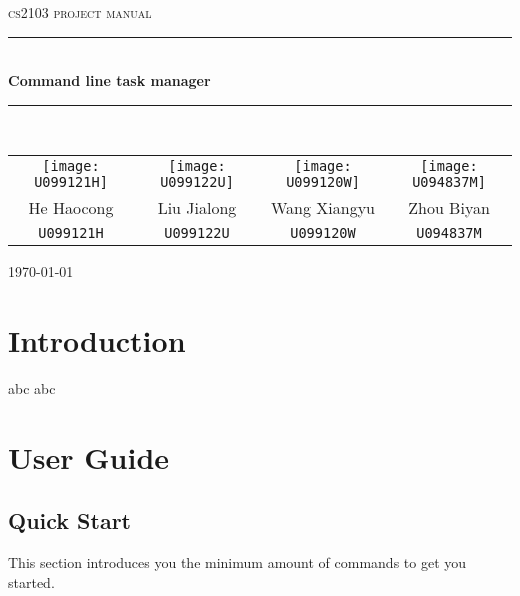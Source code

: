 \documentclass[12pt, a4paper]{article}
\begin{document}
\begin{titlepage}
  \centering

  \textsc{\LARGE cs2103 project manual}
  \\[1.5cm]
  \hrule
  \\[0.5cm]
  \Large \bfseries Command line task manager
  \\[0.4cm]
  \hrule
  \\[1.5cm]

  \begin{tabular}{c | c | c | c}
    \texttt{[image: U099121H]}&
    \texttt{[image: U099122U]}&
    \texttt{[image: U099120W]}&
    \texttt{[image: U094837M]}\\

    \small{He Haocong} & \small{Liu Jialong} & \small{Wang Xiangyu} & \small{Zhou Biyan} \\
    \small{\texttt{U099121H}} & \small{\texttt{U099122U}} & \small{\texttt{U099120W}} & \small{\texttt{U094837M}} \\

  \end{tabular}

  \vfill
  {\large \today}
\end{titlepage}


\tableofcontents

\newpage

\section{Introduction}
abc abc

\section{User Guide}
\subsection{Quick Start}

This section introduces you the minimum amount of commands to get you started.
\end{document}

